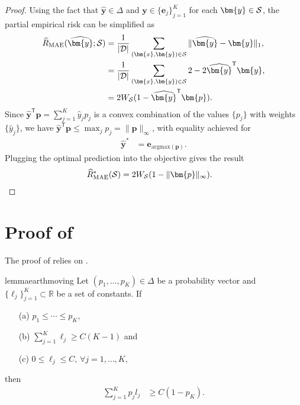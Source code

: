 \documentclass[letterpaper]{article} %
\newcommand{\R}{{\mathbb{R}}}
\newcommand{\bx}{{\bm{x}}}
\newcommand{\bp}{{\bm{p}}}
\newcommand{\by}{{\bm{y}}}
\newcommand{\be}{{\bm{e}}}
\newcommand{\T}{{\mathsf{T}}}
\newcommand{\cS}{{\cal{S}}}
\newcommand{\cD}{{\cal{D}}}
\newcommand{\WS}{{W_{\cal{S}}}}
\newcommand{\simplex}{\Delta}
\newcommand{\argmax}{\mathrm{argmax}}
\newtheorem{lemma}[theorem]{Lemma}
\begin{document}
\begin{proof}
    \medskip{}
    Using the fact that $\widehat{\by} \in \simplex$ and $\by\in\{\be_j\}_{j=1}^K$ for each $\by\in\cS$, the partial empirical risk can be simplified as
    \begin{align*}
        \widehat{R}_{\mathrm{MAE}}(\widehat{\by};\cS) &=  \frac{1}{|\cD|}\sum_{(\bx,\by)\in\cS} \|\widehat{\by}-\by\|_1,
        \\
        &= \frac{1}{|\cD|} \sum_{(\bx,\by)\in\cS} 2-2\widehat{\by}^\T\by,
        \\
        &= 2\WS(1-\widehat{\by}^\T\bp).
    \end{align*}
    Since $\widehat{\by}^\T\bp=\sum_{j=1}^K \widehat{y}_jp_j$ is a convex combination of the values $\{p_j\}$ with weights $\{\widehat{y}_j\}$, we have $\widehat{\by}^\T\bp\leq \max_{j} p_j=\|\bp\|_\infty$, with equality achieved for
    \begin{align*}
        \widehat{\by}^* &= \be_{\argmax(\bp)}.
    \end{align*}
    Plugging the optimal prediction into the objective gives the result
    \begin{align*}
        \widehat{R}_{\mathrm{MAE}}^*(\cS) &= 2\WS(1-\|\bp\|_\infty). \qedhere
    \end{align*}
\end{proof}


\section{Proof of }
\label{app:proof_universal}
The proof of  relies on .

\begin{restatable}[]{lemma}{earthmoving}
\label{lemma:earth-moving}
Let $(p_1,\ldots,p_K) \in \simplex$ be a probability vector and $\{\ell_j\}_{j=1}^K\subset \R$ be a set of constants. If
\begin{enumerate}
    \item[(a)] $p_1\leq \cdots\leq p_K$,
    \item[(b)] $\sum_{j=1}^K \ell_j\geq C(K-1)$ and
    \item[(c)] $0\leq \ell_j\leq C,\,\forall j=1,\ldots,K$,
\end{enumerate}
then
\begin{align}
    \sum_{j=1}^K p_j l_j &\geq C(1-p_K). \label{eq:earthmoving}
\end{align}
\end{restatable}
\end{document}
